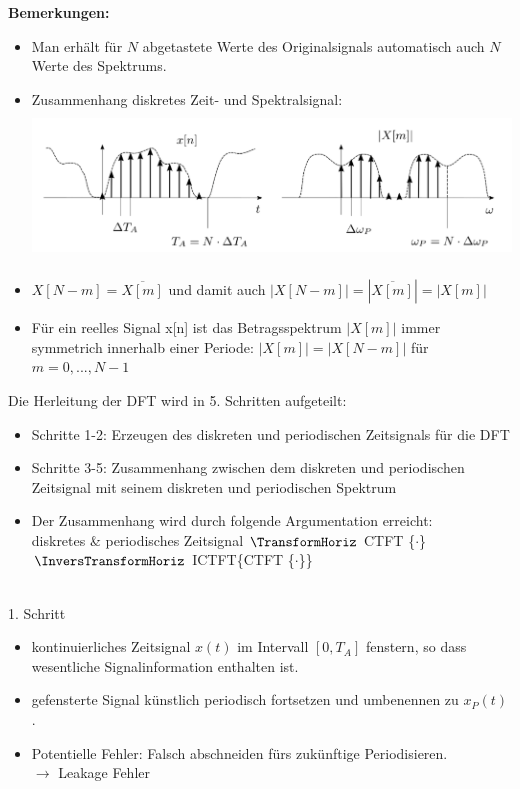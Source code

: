 \documentclass[12pt,a4paper]{scrartcl}
\begin{document}
\noindent  \textbf{Bemerkungen:}
  \begin{itemize}
    \item Man erhält für $N$ abgetastete Werte des Originalsignals automatisch auch $N$ Werte des Spektrums. 
    \item Zusammenhang diskretes Zeit- und Spektralsignal:\\\includegraphics[height = 4cm]{Pictures/ZusammenhangN.png} 
    \item $X[N-m] = \overline{X[m]}$ und damit auch $|X[N-m]| = |\overline{X[m]}| = |X[m]|$
    \item Für ein reelles Signal x[n] ist das Betragsspektrum $|X[m]|$ immer symmetrich innerhalb einer Periode: $|X[m]| = |X[N-m]|$ für $m = 0,...,N-1$ \\
  \end{itemize}

 \noindent   Die Herleitung der DFT wird in 5. Schritten aufgeteilt: 
 \begin{itemize}
   \item Schritte 1-2: Erzeugen des diskreten und periodischen Zeitsignals für die DFT
   \item Schritte 3-5: Zusammenhang zwischen dem diskreten und periodischen Zeitsignal mit seinem diskreten und periodischen Spektrum 
   \item Der Zusammenhang wird durch folgende Argumentation erreicht: \\diskretes \& periodisches Zeitsignal $\TransformHoriz$ CTFT \{$\cdot$\} $\InversTransformHoriz$ ICTFT\{CTFT \{$\cdot$\}\}  
 \end{itemize}

 \noindent \\ 1. Schritt
 \begin{itemize}
   \item kontinuierliches Zeitsignal $x(t)$ im Intervall $[0, T_A]$ fenstern, so dass wesentliche Signalinformation enthalten ist.
   \item gefensterte Signal künstlich periodisch fortsetzen und umbenennen zu $x_P (t)$.
   \item Potentielle Fehler: Falsch abschneiden fürs zukünftige Periodisieren. \\$\to$ Leakage Fehler
 \end{itemize}
 
\end{document}
